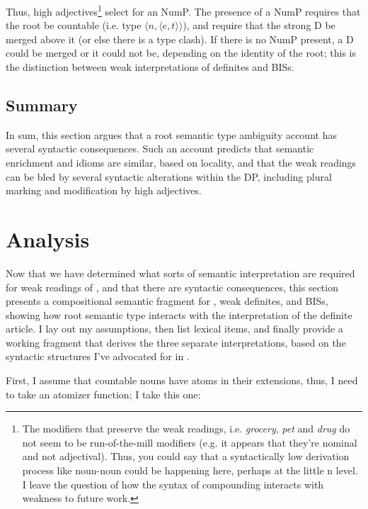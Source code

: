 \documentclass[output=paper,
modfonts
]{langscibook}
\begin{document}
Thus, high adjectives\footnote{The modifiers that preserve the weak readings, i.e. \textit{grocery}, \textit{pet} and \textit{drug} do not seem to be run-of-the-mill
modifiers (e.g. it appears that they’re nominal and not adjectival). Thus, you could say that a syntactically low derivation process like noun-noun  could be happening here, perhaps at the little n level. I leave the question of how the syntax of compounding interacts with weakness to future work.} select for an NumP. The presence of a NumP requires that the root be countable (i.e. type $\langle n, \langle e,t \rangle \rangle$), and  require that the strong D be merged above it (or else there is a type clash). If there is no NumP present, a D could be merged or it could not be, depending on the identity of the root; this is the distinction between weak interpretations of definites and BISs. 

\subsection{Summary}

In sum, this section argues that a root semantic type ambiguity account has several syntactic consequences. Such an account predicts that semantic enrichment and idioms are similar, based on locality, and that the weak readings can be bled by several syntactic alterations within the DP, including plural marking and modification by high adjectives.

\section{Analysis}\label{sec:williams:5}

Now that we have determined what sorts of semantic interpretation are required for weak readings of , and that there are syntactic consequences, this section presents a compositional semantic fragment for , weak definites, and BISs, showing how root semantic type interacts with the interpretation of the definite article. I lay out my assumptions, then list lexical items, and finally provide a working fragment that derives the three separate interpretations, based on the syntactic structures I've advocated for in .

First, I assume that countable nouns have atoms in their extensions, thus, I need to take an atomizer function; I take this one:
\end{document}
